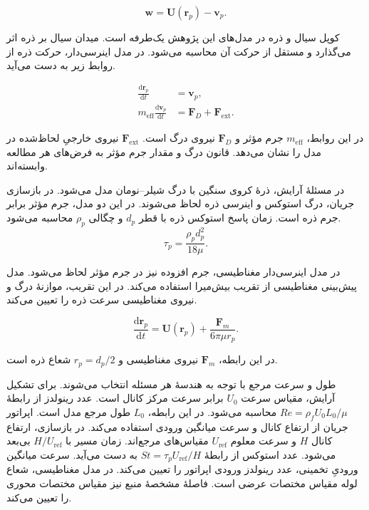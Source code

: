 \begin{equation}
\mathbf w=\mathbf U(\mathbf r_p)-\mathbf v_p.
\label{eq:theory-slip-velocity}
\end{equation}

کوپل سیال و ذره در مدل‌های این پژوهش یک‌طرفه است.
میدان سیال بر ذره اثر می‌گذارد و مستقل از حرکت آن محاسبه می‌شود.
در مدل اینرسی‌دار، حرکت ذره از روابط زیر به دست می‌آید.

\begin{equation}
\begin{aligned}
\frac{\mathrm d\mathbf r_p}{\mathrm dt} &= \mathbf v_p,\\
m_{\mathrm{eff}}\frac{\mathrm d\mathbf v_p}{\mathrm dt}
&= \mathbf F_D+\mathbf F_{\mathrm{ext}} .
\end{aligned}
\label{eq:theory-particle-motion}
\end{equation}

در این روابط، $m_{\mathrm{eff}}$ جرم مؤثر و $\mathbf F_D$ نیروی درگ است.
$\mathbf F_{\mathrm{ext}}$ نیروی خارجیِ لحاظ‌شده در مدل را نشان می‌دهد.
قانون درگ و مقدار جرم مؤثر به فرض‌های هر مطالعه وابسته‌اند.

در مسئلهٔ آرایش، ذرهٔ کروی سنگین با درگ شیلر–نومان مدل می‌شود.
در بازسازی جریان، درگ استوکس و اینرسی ذره لحاظ می‌شوند.
در این دو مدل، جرم مؤثر برابر جرم ذره است.
زمان پاسخ استوکس ذره با قطر $d_p$ و چگالی $\rho_p$ محاسبه می‌شود.
\begin{equation}
\tau_p=\frac{\rho_p d_p^2}{18\mu}.
\label{eq:theory-stokes-relaxation}
\end{equation}

در مدل اینرسی‌دار مغناطیسی، جرم افزوده نیز در جرم مؤثر لحاظ می‌شود.
مدل پیش‌بینی مغناطیسی از تقریب بیش‌میرا استفاده می‌کند.
در این تقریب، موازنهٔ درگ و نیروی مغناطیسی سرعت ذره را تعیین می‌کند.

\begin{equation}
\frac{\mathrm d\mathbf r_p}{\mathrm dt}
=\mathbf U(\mathbf r_p)+\frac{\mathbf F_m}{6\pi\mu r_p}.
\label{eq:theory-overdamped-motion}
\end{equation}

در این رابطه، $\mathbf F_m$ نیروی مغناطیسی و $r_p=d_p/2$ شعاع ذره است.


طول و سرعت مرجع با توجه به هندسهٔ هر مسئله انتخاب می‌شوند.
برای تشکیل آرایش، مقیاس سرعت $U_0$ برابر سرعت مرکز کانال است.
عدد رینولدز از رابطهٔ $Re=\rho_f U_0 L_0/\mu$ محاسبه می‌شود.
در این رابطه، $L_0$ طول مرجع مدل است.
اپراتور جریان از ارتفاع کانال و سرعت میانگین ورودی استفاده می‌کند.
در بازسازی، ارتفاع کانال $H$ و سرعت معلوم $U_{\mathrm{ref}}$ مقیاس‌های مرجع‌اند.
زمان مسیر با $H/U_{\mathrm{ref}}$ بی‌بعد می‌شود.
عدد استوکس از رابطهٔ $St=\tau_p U_{\mathrm{ref}}/H$ به دست می‌آید.
سرعت میانگین ورودیِ تخمینی، عدد رینولدز ورودی اپراتور را تعیین می‌کند.
در مدل مغناطیسی، شعاع لوله مقیاس مختصات عرضی است.
فاصلهٔ مشخصهٔ منبع نیز مقیاس مختصات محوری را تعیین می‌کند.

